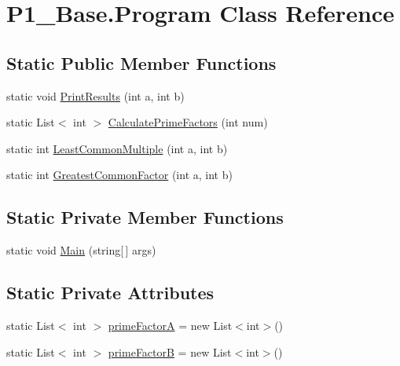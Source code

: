 \hypertarget{class_p1___base_1_1_program}{\section{P1\-\_\-\-Base.\-Program Class Reference}
\label{class_p1___base_1_1_program}
}
\subsection*{Static Public Member Functions}
\begin{DoxyCompactItemize}
\item 
static void \hyperlink{class_p1___base_1_1_program_ae53d2081a28e5cb969cdc26c7e6ffd10}{Print\-Results} (int a, int b)
\item 
static List$<$ int $>$ \hyperlink{class_p1___base_1_1_program_a2efc0cfb173d9412a525b1657335c150}{Calculate\-Prime\-Factors} (int num)
\item 
static int \hyperlink{class_p1___base_1_1_program_a771ba62e167d841cc2bb0213e5daf1a9}{Least\-Common\-Multiple} (int a, int b)
\item 
static int \hyperlink{class_p1___base_1_1_program_a647a21fde18592bc0f35077d07d60476}{Greatest\-Common\-Factor} (int a, int b)
\end{DoxyCompactItemize}
\subsection*{Static Private Member Functions}
\begin{DoxyCompactItemize}
\item 
static void \hyperlink{class_p1___base_1_1_program_aacae8edf45b15eff203ad95d08a6d39b}{Main} (string\mbox{[}$\,$\mbox{]} args)
\end{DoxyCompactItemize}
\subsection*{Static Private Attributes}
\begin{DoxyCompactItemize}
\item 
static List$<$ int $>$ \hyperlink{class_p1___base_1_1_program_a5a1d1aaa0c9be4b481faddab1e1ab753}{prime\-Factor\-A} = new List$<$int$>$()
\item 
static List$<$ int $>$ \hyperlink{class_p1___base_1_1_program_ab76652179b4151a50e1fadf328abdb44}{prime\-Factor\-B} = new List$<$int$>$()
\end{DoxyCompactItemize}


